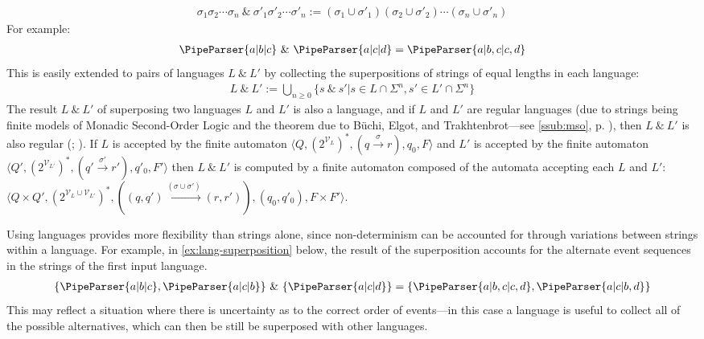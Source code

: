 \documentclass[a4paper,12pt,leqno]{article}
\newcommand{\vph}[1]{\vphantom{#1}}
\newcommand{\sta}[2]{\stackrel{#1}{#2}}
\newcommand{\ebox}[1]{\fbox{$\vph{'(),}#1$}}
\renewcommand{\sp}{~\&~}
\newcommand{\V}{\mathcal{V}}
\newcommand{\EventString}[1]{%
	\renewcommand*{\do}[1]{\ebox{##1}}%
	\PipeParser{#1}%
}
\newcommand{\nb}[1]{{\color{red}[NB\footnote{{\color{red}#1}}]}}
\begin{document}
\begin{align}\label{def:superposition}
	\sigma_1\sigma_2\cdots\sigma_n \sp \sigma'_1\sigma'_2\cdots\sigma'_n := (\sigma_1 \cup \sigma'_1)(\sigma_2 \cup \sigma'_2)\cdots(\sigma_n \cup \sigma'_n)
\end{align}
For example:
\begin{align}\label{ex:superposition}
	\EventString{a|b|c} \sp{} \EventString{a|c|d} = \EventString{a|b,c|c,d}
\end{align}
This is easily extended to pairs of languages $L \sp L'$ by collecting the superpositions of strings of equal lengths in each language:
\begin{align}\label{def:lang-superposition}
	L \sp L' := \bigcup_{n \ge 0}\{ s \sp s' | s \in L \cap \Sigma^n, s' \in L' \cap \Sigma^n\}
\end{align}
The result $L \sp L'$ of superposing two languages $L$ and $L'$ is also a language, and if $L$ and $L'$ are regular languages (due to strings being finite models of Monadic Second-Order Logic and the theorem due to B\"uchi, Elgot, and Trakhtenbrot---see \cref{ssub:mso}, p. \pageref{def:mso-regularity}), then $L \sp L'$ is also regular (\citealp{Fernando2004}; \citealp[p. 126]{woods2017towards}). If $L$ is accepted by the finite automaton $\langle Q, (2^{\V_{L}})^*, (q \sta{\sigma}{\to} r), q_0, F \rangle$ and $L'$ is accepted by the finite automaton $\langle Q', (2^{\V_{L'}})^*, (q' \sta{\sigma'}{\to} r'), q'_0, F' \rangle$ then $L \sp L'$ is computed by a finite automaton composed of the automata accepting each $L$ and $L'$: $\langle Q \times Q', (2^{\V_L \cup \V_{L'}})^*, ((q, q') \sta{(\sigma \cup \sigma')}{\to} (r, r')), (q_0, q'_0), F \times F' \rangle$.%

Using languages provides more flexibility than strings alone, since non-determinism can be accounted for through variations between strings within a language. For example, in \cref{ex:lang-superposition} below, the result of the superposition accounts for the alternate event sequences in the strings of the first input language.
\begin{align}\label{ex:lang-superposition}
	\{\EventString{a|b|c}, \EventString{a|c|b}\} \sp \{\EventString{a|c|d}\} = \{\EventString{a|b,c|c,d}, \EventString{a|c|b,d}\}
\end{align}
This may reflect a situation where there is uncertainty as to the correct order of events---in this case a language is useful to collect all of the possible alternatives, which can then be still be superposed with other languages. 
\end{document}
